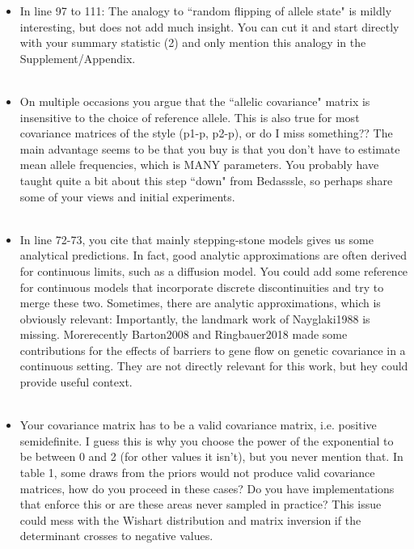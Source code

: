 \documentclass[11pt]{letter}
\newcommand{\gb}[1]{{\bf\color{black}{#1}}}
\begin{document}
\begin{itemize}
\item In line 97 to 111: The analogy to ``random flipping of allele state" is mildly interesting, 
but does not add much insight. 
You can cut it and start directly with your summary statistic (2) and only mention this analogy in the Supplement/Appendix.\\\\
\gb{RESPONSE.}

\item On multiple occasions you argue that the ``allelic covariance" matrix is insensitive to the choice of reference allele. 
This is also true for most covariance matrices of the style (p1-p, p2-p), or do I miss something??
The main advantage seems to be that you buy is that you don't have to estimate mean allele frequencies, which is MANY parameters. 
You probably have taught quite a bit about this step ``down" from Bedasssle, so perhaps share some of your views and initial experiments.\\\\
\gb{RESPONSE.}

\item In line 72-73, you cite that mainly stepping-stone models gives us some analytical predictions. 
In fact, good analytic approximations are often derived for continuous limits, such as a diffusion model.
You could add some reference for continuous models that incorporate discrete discontinuities and try to merge these two. 
Sometimes, there are analytic approximations, which is obviously relevant: 
Importantly, the landmark work of Nayglaki1988 is missing. 
Morerecently Barton2008 and Ringbauer2018 made some contributions 
for the effects of barriers to gene flow on genetic covariance in a continuous setting. 
They are not directly relevant for this work, but hey could provide useful context.\\\\
\gb{RESPONSE.}

\item Your covariance matrix has to be a valid covariance matrix, i.e. positive semidefinite. 
I guess this is why you choose the power of the exponential to be between 0 and 2 
(for other values it isn't), but you never mention that. 
In table 1, some draws from the priors would not produce valid covariance matrices, 
how do you proceed in these cases? 
Do you have implementations that enforce this or are these areas never sampled in practice? 
This issue could mess with the Wishart distribution and matrix inversion if the determinant crosses to negative values.\\\\
\gb{RESPONSE.}


\end{itemize}
\end{document}
